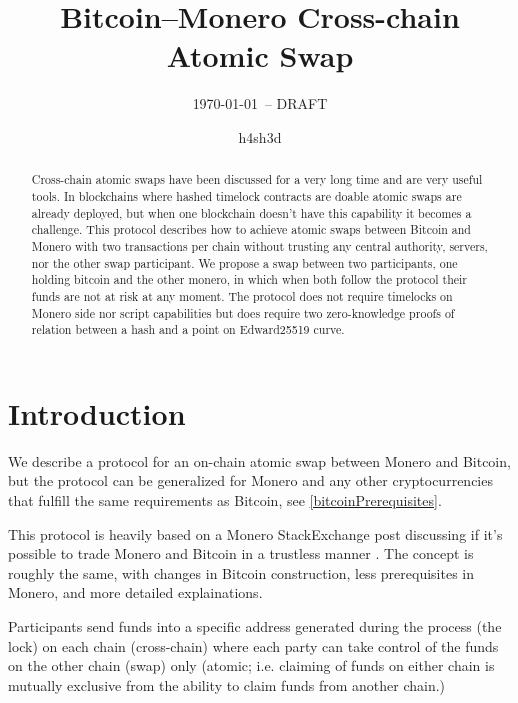 \documentclass{llncs}
\begin{document}
\title{Bitcoin--Monero Cross-chain Atomic Swap}
\author{h4sh3d}

\subtitle{{\normalsize\today{\small\ -- DRAFT}}}

\maketitle

\begin{abstract}
    Cross-chain atomic swaps have been discussed for a very long time and are very useful tools. In blockchains where hashed timelock contracts are doable atomic swaps are already deployed, but when one blockchain doesn't have this capability it becomes a challenge. This protocol describes how to achieve atomic swaps between Bitcoin and Monero with two transactions per chain without trusting any central authority, servers, nor the other swap participant.
    We propose a swap between two participants, one holding bitcoin and the other monero, in which when both follow the protocol their funds are not at risk at any moment. The protocol does not require timelocks on Monero side nor script capabilities but does require two zero-knowledge proofs of relation between a hash and a point on Edward25519 curve.
\end{abstract}

\section{Introduction}
We describe a protocol for an on-chain atomic swap between Monero and Bitcoin, but the protocol can be generalized for Monero and any other cryptocurrencies that fulfill the same requirements as Bitcoin, see \ref{bitcoinPrerequisites}.

This protocol is heavily based on a Monero StackExchange post discussing if it's possible to trade Monero and Bitcoin in a trustless manner \cite{MoneroStackexchangeSwap}. The concept is roughly the same, with changes in Bitcoin construction, less prerequisites in Monero, and more detailed explainations.

Participants send funds into a specific address generated during the process (the lock) on each chain (cross-chain) where each party can take control of the funds on the other chain (swap) only (atomic; i.e. claiming of funds on either chain is mutually exclusive from the ability to claim funds from another chain.)
\end{document}
